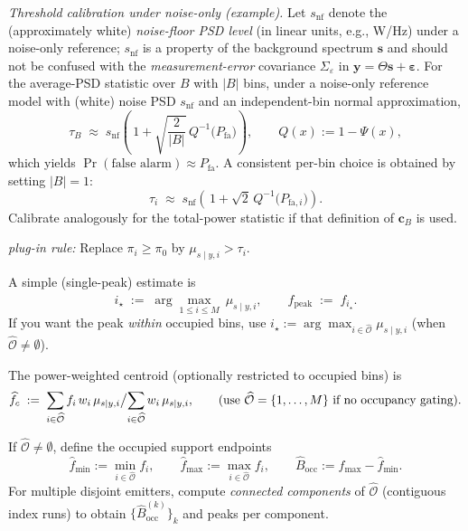 \documentclass[11pt,a4paper]{report}
\theoremstyle{definition}
\providecommand{\ve}[1]{{\boldsymbol{#1}}}
\begin{document}
\begin{description}
\textit{Threshold calibration under noise-only (example).}
Let $s_{\mathrm{nf}}$ denote the (approximately white) \emph{noise-floor PSD level} (in linear units, e.g., W/Hz) under a noise-only reference; $s_{\mathrm{nf}}$ is a property of the background spectrum $\ve{s}$ and should not be confused with the \emph{measurement-error} covariance $\boldsymbol{\varSigma}_{\varepsilon}$ in $\ve{y}{=}\boldsymbol{\varTheta}\ve{s}{+}\boldsymbol{\varepsilon}$.
For the average-PSD statistic over $B$ with $|B|$ bins, under a noise-only reference model with (white) noise PSD $s_{\mathrm{nf}}$ and an independent-bin normal approximation,
\[
\tau_B 
\;\approx\; s_{\mathrm{nf}}\!\left(\,1 + \sqrt{\frac{2}{|B|}}\,Q^{-1}\!\big(P_{\mathrm{fa}}\big)\right),
\qquad
Q(x) := 1 - \Psi(x),
\]
which yields $\Pr(\text{false alarm}) {\approx} P_{\mathrm{fa}}$.
A consistent per-bin choice is obtained by setting $|B|{=}1$:
\[
\tau_i \;\approx\; s_{\mathrm{nf}}\!\left(\,1 + \sqrt{2}\,Q^{-1}\!\big(P_{\mathrm{fa},i}\big)\right).
\]
Calibrate analogously for the total-power statistic if that definition of $\mathbf{c}_B$ is used.

\textit{plug-in rule:} Replace $\pi_i\ge\pi_0$ by $\mu_{s\mid y,i}>\tau_i$.

\item[{Peak frequency.}]
A simple (single-peak) estimate is
\[
i_\star \;:=\; \arg\max_{1\le i\le M}\ \mu_{s\mid y,i},
\qquad
\widehat{f}_{\mathrm{peak}} \;:=\; f_{i_\star}.
\]
If you want the peak \emph{within} occupied bins, use
$
i_\star := \arg\max_{i\in\widehat{\mathcal{O}}}\mu_{s\mid y,i}
$
(when $\widehat{\mathcal{O}}\neq\emptyset$).

\item[{Spectral centroid (center frequency).}]
The power-weighted centroid (optionally restricted to occupied bins) is
\[
\widehat{f}_{c}
\;:=\;
{\sum\limits_{i\in\widehat{\mathcal{O}}} f_i\, w_i\, \mu_{s\mid y,i}}
\big{/}{\sum\limits_{i\in\widehat{\mathcal{O}}} w_i\, \mu_{s\mid y,i}},
\qquad
\text{(use } \widehat{\mathcal{O}}=\{1,\dots,M\}\text{ if no occupancy gating).}
\]

\item[{Occupied bandwidth.}]
If $\widehat{\mathcal{O}}\neq\emptyset$, define the occupied support endpoints
\[
\widehat{f}_{\min}:=\min_{i\in\widehat{\mathcal{O}}} f_i,
\qquad
\widehat{f}_{\max}:=\max_{i\in\widehat{\mathcal{O}}} f_i,
\qquad
\widehat{B}_{\mathrm{occ}}:=\widehat{f}_{\max}-\widehat{f}_{\min}.
\]
For multiple disjoint emitters, compute \emph{connected components} of $\widehat{\mathcal{O}}$
(contiguous index runs) to obtain $\{\widehat{B}_{\mathrm{occ}}^{(k)}\}_k$ and peaks per component.


\end{description}
\end{document}
